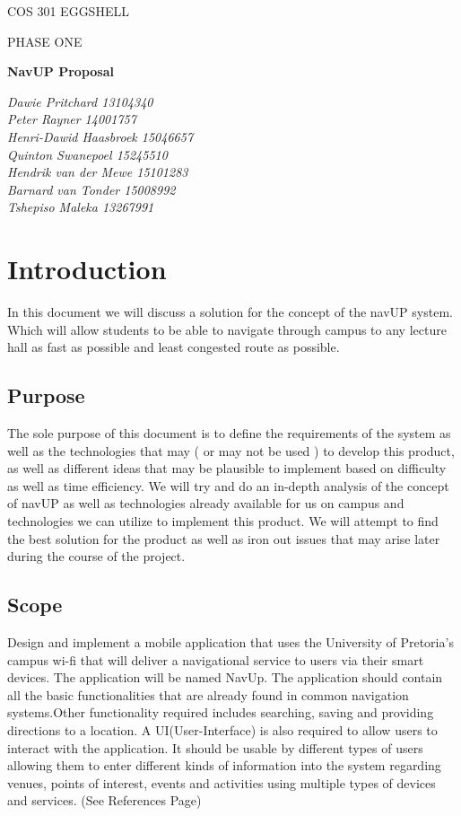 \documentclass{article}
\begin{document}
\begin{titlepage}
	\centering
	{\scshape\LARGE COS 301 EGGSHELL   \par}
	\vspace{1cm}
	{\scshape\Large PHASE ONE \par}
	\vspace{1.5cm}
	{\huge\bfseries NavUP Proposal\par}
	\vspace{2cm}
	{\Large\itshape  Dawie Pritchard 13104340 \\ Peter Rayner 14001757 \\ Henri-Dawid Haasbroek 15046657 \\ Quinton Swanepoel 15245510 \\ Hendrik van der Mewe 15101283 \\ Barnard van Tonder 15008992 \\ Tshepiso Maleka 13267991\par}
	
\end{titlepage}

\tableofcontents

\newpage
\centering
\section{Introduction}
In this document we will discuss a solution for the concept of the navUP system. Which will allow students to be able to navigate through campus to any lecture hall as fast as possible and least congested route as possible.
\subsection {Purpose}
The sole purpose of this document is to define the requirements of the system as well as the technologies that may ( or may not be used ) to develop this product, as well as different ideas that may be plausible to implement based on difficulty as well as time efficiency. We will try and do an in-depth analysis of the concept of navUP as well as technologies already available for us on campus and technologies we can utilize to implement this product. We will attempt to find the best solution for the product as well as iron out issues that may arise later during the course of the project. 
\subsection {Scope}
Design and implement a mobile application that uses the University of Pretoria's campus wi-fi that will deliver a navigational service to users via their smart devices. The application will be named NavUp. The application should contain all the basic functionalities that are already found in common navigation systems.Other functionality required includes searching, saving and providing directions to a location. A UI(User-Interface) is also required to allow users to interact with the application. It should be usable by different types of users allowing them to enter different kinds of information into the system regarding venues, points of interest, events and activities using multiple types of devices and services. (See References Page)
\end{document}
